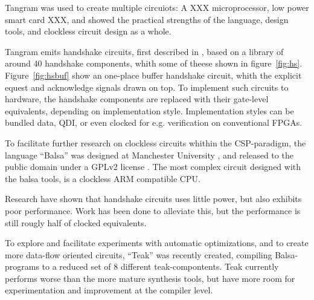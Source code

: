 Tangram was used to create multiple circuiots: A XXX microprocessor,
low power smart card XXX, and showed the practical strengths of the
language, design tools,  and clockless circuit design as a
whole.

Tangram emits handshake circuits, first described in
\cite{12,teakxxx}, based on a library of around 40 handshake
components, whith some of theese shown in
figure~\ref{fig:hs}. Figure~\ref{fig:hsbuf} show an one-place buffer
handshake circuit, whith the explicit equest and acknowledge signals
drawn on top. To implement such circuits to hardware, the handshake
components are replaced with their gate-level equivalents, depending
on implementation style. Implementation styles can be bundled data,
QDI, or even clocked for e.g. verification on conventional FPGAs.


To facilitate further research on clockless circuits whithin the
CSP-paradigm, the language ``Balsa'' was designed at Manchester
University \cite{xxx}, and released to the public domain under a GPLv2
license \cite{gpl}. The most complex circuit designed with the balsa
tools, is a clockless ARM\cite{arm} compatible CPU\cite{spa}.

Research have shown that handshake circuits uses little power\cite{xxx},
but also exhibits poor performance\cite{xxx}. Work has been done to
alleviate this\cite{xxx}, but the performance is still rougly half of
clocked equivalents.

To explore and facilitate experiments with automatic optimizations,
and to create more data-flow oriented circuits, ``Teak''\cite{teak}
was recently created, compiling Balsa-programs to a reduced set of 8
different teak-compontents. Teak currently performs worse than the
more mature synthesis tools, but have more room for experimentation
and improvement at the compiler level.


